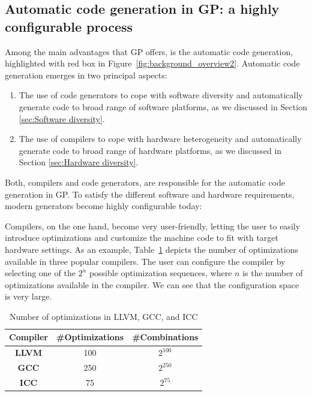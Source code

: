 \subsection{Automatic code generation in GP: a highly configurable process}
Among the main advantages that GP offers, is the automatic code generation, highlighted with red box in Figure~\ref{fig:background_overview2}. Automatic code generation emerges in two principal aspects: 
\begin{enumerate}
	\item The use of code generators to cope with software diversity and automatically generate code to broad range of software platforms, as we discussed in Section \ref{sec:Software diversity}.
	\item The use of compilers to cope with hardware heterogeneity and automatically generate code to broad range of hardware platforms, as we discussed in Section \ref{sec:Hardware diversity}.
\end{enumerate}

Both, compilers and code generators, are responsible for the automatic code generation in GP. To satisfy the different software and hardware requirements, modern generators become highly configurable today: 

Compilers, on the one hand, become very user-friendly, letting the user to easily introduce optimizations and customize the machine code to fit with target hardware settings.
As an example, Table~\ref{iccgccllvm} depicts the number of optimizations available in three popular compilers. The user can configure the compiler by selecting one of the $2^{n}$ possible optimization sequences, where $n$ is the number of optimizations available in the compiler. We can see that the configuration space is very large. 

\begin{table}[h]
	\centering
	\caption{Number of optimizations in LLVM, GCC, and ICC}
	\label{my-label}
	\begin{tabular}{|c|c|c|}
		\hline
		\textbf{Compiler} & \textbf{\#Optimizations} & \textbf{\#Combinations} \\ \hline
		\textbf{LLVM}     & 100    & $2^{100}$                                 \\ \hline
		\textbf{GCC}      & 250    & $2^{250}$                                 \\ \hline
		\textbf{ICC}      & 75     & $2^{75}$                                 \\ \hline
	\end{tabular}
	\label{iccgccllvm}
\end{table}

